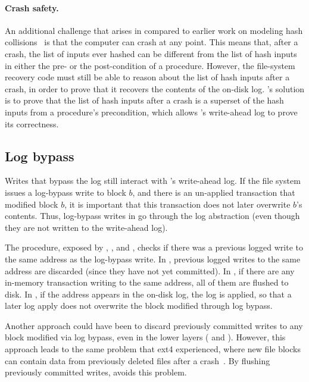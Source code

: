 \paragraph{Crash safety.}

An additional challenge that arises in \syslog compared to earlier work on
modeling hash collisions~\cite{Barthe:2014:PRV:2578855.2535847} is that the
computer can crash at any point.  This means that, after a crash, the list
of inputs ever hashed can be different from the list of hash inputs in
either the pre- or the post-condition of a procedure.  However, the
file-system recovery code must still be able to reason about the list of
hash inputs after a crash, in order to prove that it recovers the contents
of the on-disk log.  \syslog's solution is to prove that the list of hash
inputs after a crash is a superset of the hash inputs from a procedure's
precondition, which allows \syslog's write-ahead log to prove its
correctness.


\subsection{Log bypass}
\label{sec:log:bypass}

Writes that bypass the log still interact with \sys's write-ahead log.  If
the file system issues a log-bypass write to block $b$, and there is an
un-applied transaction that modified block $b$, it is important that this
transaction does not later overwrite $b$'s contents.  Thus, log-bypass
writes in \sys go through the log abstraction (even though they are not
written to the write-ahead log).

The  procedure, exposed by \logapi, \grouplog, and \memlog,
checks if there was a previous logged write to the same address as the
log-bypass write.  In \logapi, previous logged writes to the same address
are discarded (since they have not yet committed).  In \grouplog, if there
are any in-memory transaction writing to the same address, all of them are
flushed to disk.  In \memlog, if the address appears in the on-disk log,
the log is applied, so that a later log apply does not overwrite the block
modified through log bypass.

Another approach could have been to discard previously committed writes to
any block modified via log bypass, even in the lower layers (\grouplog
and \memlog).  However, this approach leads to the same problem that ext4
experienced, where new file blocks can contain data from previously deleted
files after a crash~\cite{git:469017}.  By flushing previously committed
writes, \syslog avoids this problem.


